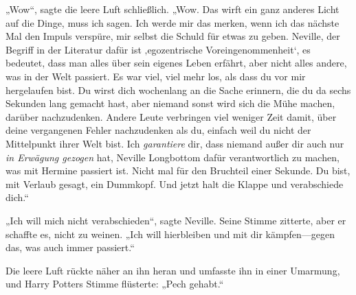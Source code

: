„Wow“, sagte die leere Luft schließlich. „Wow. Das wirft ein ganz anderes Licht auf die Dinge, muss ich sagen. Ich werde mir das merken, wenn ich das nächste Mal den Impuls verspüre, mir selbst die Schuld für etwas zu geben. Neville, der Begriff in der Literatur dafür ist ‚egozentrische Voreingenommenheit‘, es bedeutet, dass man alles über sein eigenes Leben erfährt, aber nicht alles andere, was in der Welt passiert. Es war viel, viel mehr los, als dass du vor mir hergelaufen bist. Du wirst dich wochenlang an die Sache erinnern, die du da sechs Sekunden lang gemacht hast, aber niemand sonst wird sich die Mühe machen, darüber nachzudenken. Andere Leute verbringen viel weniger Zeit damit, über deine vergangenen Fehler nachzudenken als du, einfach weil du nicht der Mittelpunkt ihrer Welt bist. Ich \emph{garantiere} dir, dass niemand außer dir auch nur \emph{in Erwägung gezogen} hat, Neville Longbottom dafür verantwortlich zu machen, was mit Hermine passiert ist. Nicht mal für den Bruchteil einer Sekunde. Du bist, mit Verlaub gesagt, ein Dummkopf. Und jetzt halt die Klappe und verabschiede dich.“

„Ich will mich nicht verabschieden“, sagte Neville. Seine Stimme zitterte, aber er schaffte es, nicht zu weinen. „Ich will hierbleiben und mit dir kämpfen—gegen das, was auch immer passiert.“

Die leere Luft rückte näher an ihn heran und umfasste ihn in einer Umarmung, und Harry Potters Stimme flüsterte: „Pech gehabt.“

